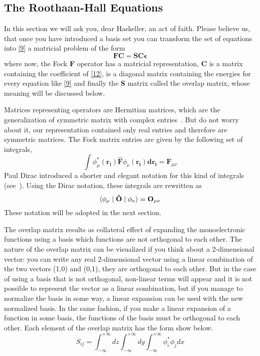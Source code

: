 \documentclass{tmr}
\newcommand{\inftyint}{\int_{-\infty}^{+\infty}}
\begin{document}
\subsection{The Roothaan-Hall Equations}
In this section we will ask you, dear Haskeller, an act of faith. Please believe us,
that once you have introduced a basis set you can transform the set of equations into
\eqref{9} a matricial problem of the form 
\begin{equation}\label{13}
\mathbf{FC} = \mathbf{SC\epsilon}
\end{equation}
where now, the Fock \textbf{F} operator has a matricial representation, 
\textbf{C} is a matrix containing the coefficient of \eqref{12}, \textbf{\textepsilon}
is a diagonal matrix containing the energies for every equation like \eqref{9} and finally
the \textbf{S} matrix called the overlap matrix, whose meaning will be discussed below.

\par Matrices representing operators are Hermitian matrices, which are the generalization
of symmetric matrix with complex entries~\cite{hermitian}. But do not worry about it, our representation
contained only real entries and therefore are symmetric matrices. The Fock matrix entries 
are given by the following set of integrals,
\[ \int{\phi^{*}_{\mu}(\mathbf{r_{i}}) \mathbf{\hat F} \phi_{\nu}(\mathbf{r_{i}}) \mathbf{dr_{i}}} =
 \mathbf{F}_{\mu \nu} \]
Paul Dirac introduced a shorter and elegant notation for 
this kind of integrals (see~\cite{bra-ket}). Using the Dirac notation, these integrals are rewritten as
\begin{equation}\label{14}
 \braket{\phi_{\mu} \mid \mathbf{\hat O} \mid  \phi_{\nu}}  = \mathbf{O}_{\mu \nu} 
\end{equation}
These notation will be adopted in the next section.

The overlap  matrix results as collateral effect of expanding the monoelectronic 
functions using a basis which functions are not orthogonal to each other. The nature 
of the overlap matrix can be visualized if you think about a 2-dimensional vector:
you can write any real 2-dimensional vector using a linear combination of the two
vectors (1,0) and (0,1), they are orthogonal to each other. But in the case 
of using a basis that is not orthogonal, non-linear terms will appear and 
it is not possible to represent the vector as a linear combination, 
but if you manage to normalize the basis in some way, a linear expansion can
be used with the new normalized basis. In the same fashion, if you make a linear expansion 
of a function in some basis, the functions of the basis must be orthogonal
to each other. Each element of the overlap matrix has the form show below.
\begin{equation}\label{15}
S_{ij} = \inftyint {dz \inftyint {dy \inftyint {\phi^{*}_{i} \phi_{j}dx}}} 
\end{equation}
\end{document}
